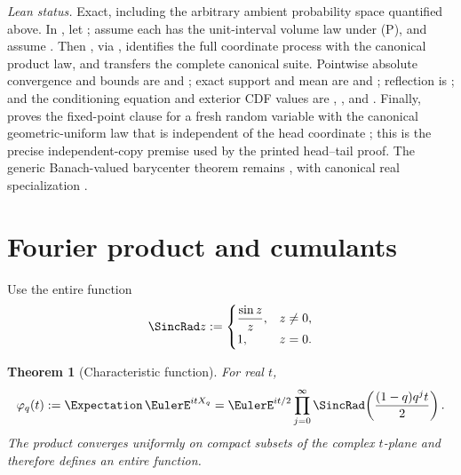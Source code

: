 \documentclass[11pt,a4paper,oneside,openany]{book}
\newtheorem{theorem}{Theorem}[chapter]
\theoremstyle{definition}
\theoremstyle{remark}
\begin{document}
\emph{Lean status.}  Exact, including the arbitrary ambient probability space
quantified above.  In , let
; assume each  has the
unit-interval volume law under (P), and assume .
Then , via
, identifies the full coordinate process
with the canonical product law, and
 transfers the complete canonical
suite.  Pointwise absolute convergence and bounds are
 and
; exact support and mean are
 and
; reflection is
; and the conditioning
equation and exterior CDF values are
,
, and
.
Finally,  proves the
fixed-point clause for a fresh random variable with the canonical
geometric-uniform law that is independent of the head coordinate
; this is the precise independent-copy premise used by the printed
head--tail proof.  The generic Banach-valued barycenter theorem remains
, with canonical real
specialization
.

\section{Fourier product and cumulants}

Use the entire function
\[
 \SincRad z:=
 \begin{cases}
  \dfrac{\sin z}{z},&z\ne0,\\
  1,&z=0.
 \end{cases}
\]

\begin{theorem}[Characteristic function]\label{thm:geometric-uniform-characteristic}
For real $t$,
\begin{equation}\label{eq:geometric-uniform-characteristic}
 \varphi_q(t):=\Expectation\,\EulerE^{itX_q}
 =\EulerE^{it/2}\prod_{j=0}^{\infty}
 \SincRad\!\left(\frac{(1-q)q^jt}{2}\right).
\end{equation}
The product converges uniformly on compact subsets of the complex $t$-plane and therefore defines an entire function.
\end{theorem}
\end{document}
